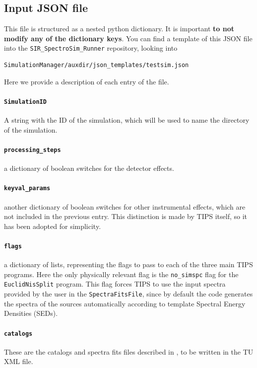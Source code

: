 \subsection{Input JSON file}\label{subsec:input_JSON}
This file is structured as a nested python dictionary. It is important \textbf{to not modify any of the dictionary keys}. You can find a template of this JSON file into the \verb+SIR_SpectroSim_Runner+ repository, looking into

\begin{verbatim}
SimulationManager/auxdir/json_templates/testsim.json
\end{verbatim}

Here we provide a description of each entry of the file.

\paragraph{\texttt{SimulationID}} A string with the ID of the simulation, which will be used to name the directory of the simulation.

\paragraph{\texttt{processing\_steps}} a dictionary of boolean switches for the detector effects.

\paragraph{\texttt{keyval\_params}} another dictionary of boolean switches for other instrumental effects, which are not included in the previous entry. This distinction is made by TIPS itself, so it has been adopted for simplicity.

\paragraph{\texttt{flags}} a dictionary of lists, representing the flags to pass to each of the three main TIPS programs. Here the only physically relevant flag is the \verb+no_simspc+ flag for the \verb+EuclidNisSplit+ program. This flag forces TIPS to use the input spectra provided by the user in the \verb+SpectraFitsFile+, since by default the code generates the spectra of the sources automatically according to template Spectral Energy Densities (SEDs).

\paragraph{\texttt{catalogs}} These are the catalogs and spectra fits files described in , to be written in the TU XML file.

